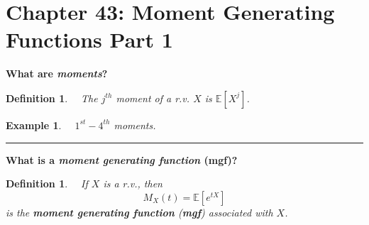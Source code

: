\documentclass[12pt]{amsart}
\newtheorem{definition}[theorem]{Definition}
\newtheorem{example}[theorem]{Example}
\newcommand\Ebb{\mathbb{E}}
\newcommand\mgfX{M_X(t)}
\begin{document}
\setcounter{section}{43}
{\huge  
\section*{Chapter 43: Moment Generating Functions \newline
Part 1}
}

{\large %




\vspace{.5cm}
\begin{center}
\textbf{What are \textit{moments}?} 
\end{center}

\vspace{.5cm}
\begin{definition} \ \  The $j^{th}$ moment of a r.v. $X$ is $\Ebb[X^j]$.
\end{definition}

\vspace{.5cm}
\begin{example} \ \  $1^{st}-4^{th}$ moments.
\end{example}

\vspace{6cm}
\hrule
\vspace{.5cm}

\begin{center}
\textbf{What is a \textit{moment generating function} (mgf)?} 
\end{center}

\vspace{.5cm}
\begin{definition} \ \  If $X$ is a r.v., then 
$$
\mgfX = \Ebb[e^{tX}]
$$
is the \textbf{moment generating function} (\textbf{mgf}) associated with $X$.
\end{definition}

}
\end{document}
